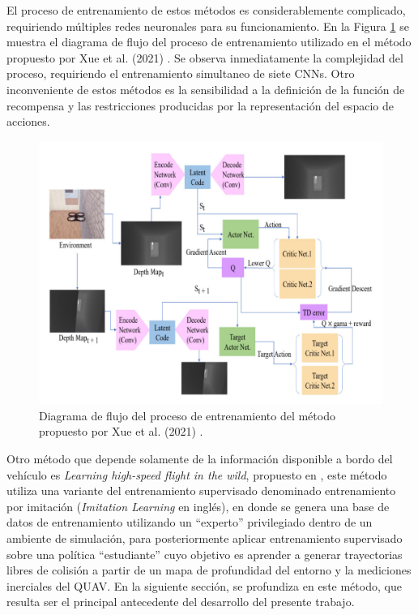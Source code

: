 El proceso de entrenamiento de estos métodos es considerablemente complicado, requiriendo múltiples redes neuronales para su funcionamiento. En la Figura \ref{fig:prev-rl-training-process} se muestra el diagrama de flujo del proceso de entrenamiento utilizado en el método propuesto por Xue et al. (2021) \cite{Xue2021}. Se observa inmediatamente la complejidad del proceso, requiriendo el entrenamiento simultaneo de siete CNNs. Otro inconveniente de estos métodos es la sensibilidad a la definición de la función de recompensa y las restricciones producidas por la representación del espacio de acciones.

\begin{figure}[H]
    \centering
    \includegraphics[scale=0.4]{partes/img/RL-training-process.png}
    \caption[Diagrama de flujo del proceso de entrenamiento utilizado en \textit{Vision Based Drone Obstacle Avoidance by Deep Reinforcement Learning}]{Diagrama de flujo del proceso de entrenamiento del método propuesto por Xue et al. (2021) \cite{Xue2021}.}
    \label{fig:prev-rl-training-process}
\end{figure}

Otro método que depende solamente de la información disponible a bordo del vehículo es \textit{Learning high-speed flight in the wild}, propuesto en \cite{Loquercio2021}, este método utiliza una variante del entrenamiento supervisado denominado entrenamiento por imitación (\textit{Imitation Learning} en inglés), en donde se genera una base de datos de entrenamiento utilizando un ``experto'' privilegiado dentro de un ambiente de simulación, para posteriormente aplicar entrenamiento supervisado sobre una política ``estudiante'' cuyo objetivo es aprender a generar trayectorias libres de colisión a partir de un mapa de profundidad del entorno y la mediciones inerciales del QUAV. En la siguiente sección, se profundiza en este método, que resulta ser el principal antecedente del desarrollo del presente trabajo.

